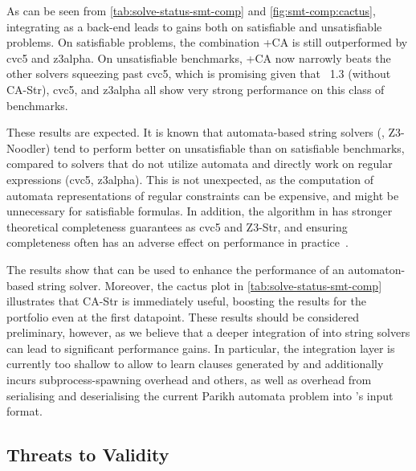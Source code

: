 As can be seen from \cref{tab:solve-status-smt-comp} and \cref{fig:smt-comp:cactus},
integrating \Catra{} as a back-end
leads to gains both on satisfiable and unsatisfiable problems. On
satisfiable problems, the combination \Ostrich+CA is still
outperformed by cvc5 and z3alpha. On unsatisfiable benchmarks,
\Ostrich+CA now narrowly beats the other solvers squeezing past cvc5,
which is promising given that \Ostrich{}~1.3 (without CA-Str), cvc5, and z3alpha all show very strong
performance on this class of benchmarks.

These results are expected. It is known that automata-based string solvers (\Ostrich{}, Z3-Noodler) 
tend to perform better on unsatisfiable than on satisfiable benchmarks, compared to solvers
that do not utilize automata and directly work on regular expressions (cvc5, z3alpha).
This is not unexpected, as the computation of automata representations of regular 
constraints can be expensive, and might be unnecessary for satisfiable formulas.
In addition, the algorithm in \Ostrich{} has stronger theoretical completeness
guarantees as cvc5 and Z3-Str, and ensuring completeness often has an adverse
effect on performance in practice~\cite{ostrich,Z3-str,cvc5}.

The results show that \Calculus{} can be used to enhance the performance of an
automaton-based string solver. Moreover, the cactus plot in \cref{tab:solve-status-smt-comp} 
illustrates that
CA-Str is immediately useful, boosting the results for the \Ostrich{} portfolio
even at the first datapoint. These results should be considered preliminary,
however, as we believe that a deeper integration of \Catra{} into string solvers
can lead to significant performance gains. In particular, the integration layer 
is currently too shallow to allow \Ostrich{} to learn clauses generated by \Catra{}
and additionally incurs subprocess-spawning overhead and others, as well as overhead
from serialising and deserialising the current Parikh automata problem into \Catra{}'s
input format.

\subsection{Threats to Validity}


